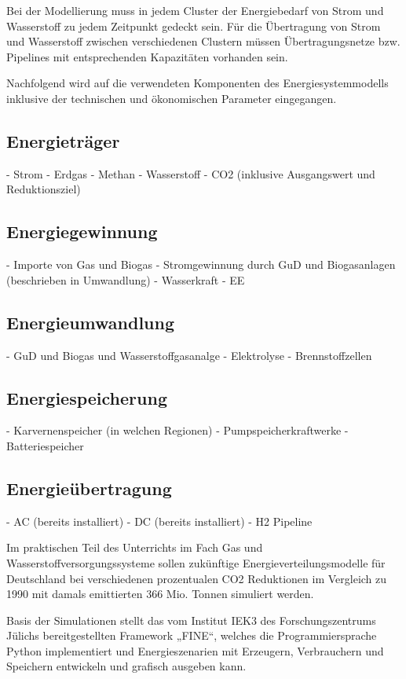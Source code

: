 Bei der Modellierung muss in jedem Cluster der Energiebedarf von Strom und Wasserstoff zu jedem Zeitpunkt gedeckt sein. Für die Übertragung von Strom und Wasserstoff zwischen verschiedenen Clustern müssen Übertragungsnetze bzw. Pipelines mit entsprechenden Kapazitäten vorhanden sein. 

Nachfolgend wird auf die verwendeten Komponenten des Energiesystemmodells inklusive der technischen und ökonomischen Parameter eingegangen. 
 
\subsection{Energieträger}
- Strom
- Erdgas
- Methan
- Wasserstoff
- CO2 (inklusive Ausgangswert und Reduktionsziel)

\subsection{Energiegewinnung}
- Importe von Gas und Biogas
- Stromgewinnung durch GuD und Biogasanlagen (beschrieben in Umwandlung)
- Wasserkraft
- EE 

\subsection{Energieumwandlung}
- GuD und Biogas und Wasserstoffgasanalge 
- Elektrolyse 
- Brennstoffzellen

\subsection{Energiespeicherung}
- Karvernenspeicher (in welchen Regionen)
- Pumpspeicherkraftwerke
- Batteriespeicher

\subsection{Energieübertragung}
- AC (bereits installiert)
- DC (bereits installiert)
- H2 Pipeline



\newpage
{}
Im praktischen Teil des Unterrichts im Fach Gas und Wasserstoffversorgungssysteme sollen zukünftige Energieverteilungsmodelle für Deutschland bei verschiedenen prozentualen CO2 Reduktionen im Vergleich zu 1990 mit damals emittierten 366 Mio. Tonnen simuliert werden. 

Basis der Simulationen stellt das vom Institut IEK3 des Forschungszentrums Jülichs bereitgestellten Framework „FINE“, welches die Programmiersprache Python implementiert und Energieszenarien mit Erzeugern, Verbrauchern und Speichern entwickeln und grafisch ausgeben kann.

